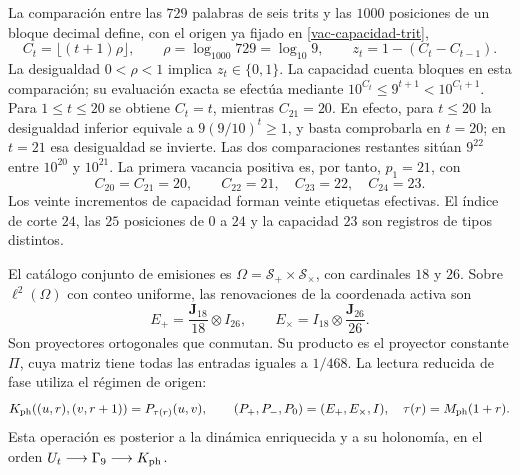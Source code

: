 La comparación entre las $729$ palabras de seis trits y las $1000$
posiciones de un bloque decimal define, con el origen ya fijado en
\ref{vac-capacidad-trit},
\begin{equation}
 C_t=\lfloor(t+1)\rho\rfloor,
 \qquad \rho=\log_{1000}729=\log_{10}9,
 \qquad z_t=1-(C_t-C_{t-1}).
 \label{eq:ii-ter27-capacidad}
\end{equation}
La desigualdad $0<\rho<1$ implica $z_t\in\{0,1\}$. La capacidad cuenta
bloques en esta comparación; su evaluación exacta se efectúa mediante
$10^{C_t}\leq9^{t+1}<10^{C_t+1}$. Para $1\leq t\leq20$ se obtiene
$C_t=t$, mientras $C_{21}=20$. En efecto, para $t\leq20$ la desigualdad
inferior equivale a $9(9/10)^t\geq1$, y basta comprobarla en $t=20$;
en $t=21$ esa desigualdad se invierte. Las dos comparaciones restantes
sitúan $9^{22}$ entre $10^{20}$ y $10^{21}$. La primera vacancia positiva
es, por tanto, $p_1=21$, con
\[
 C_{20}=C_{21}=20,\qquad C_{22}=21,\quad C_{23}=22,\quad C_{24}=23.
\]
Los veinte incrementos de capacidad forman veinte etiquetas efectivas.
El índice de corte $24$, las $25$ posiciones de $0$ a $24$ y la capacidad
$23$ son registros de tipos distintos.

El catálogo conjunto de emisiones es
$\Omega=\mathcal S_+\times\mathcal S_\times$, con cardinales $18$ y
$26$. Sobre $\ell^2(\Omega)$ con conteo uniforme, las renovaciones de
la coordenada activa son
\[
 E_+=\frac{\mathbf J_{18}}{18}\otimes I_{26},\qquad
 E_\times=I_{18}\otimes\frac{\mathbf J_{26}}{26}.
\]
Son proyectores ortogonales que conmutan. Su producto es el proyector
constante $\Pi$, cuya matriz tiene todas las entradas iguales a $1/468$.
La lectura reducida de fase utiliza el régimen de origen:
\[
 K_{\rm ph}((u,r),(v,r+1))=P_{\tau(r)}(u,v),
 \qquad (P_+,P_-,P_0)=(E_+,E_\times,I),
 \quad \tau(r)=M_{\rm ph}(1+r).
\]
Esta operación es posterior a la dinámica enriquecida y a su holonomía,
en el orden $U_t\longrightarrow\Gamma_9\longrightarrow K_{\rm ph}$.

